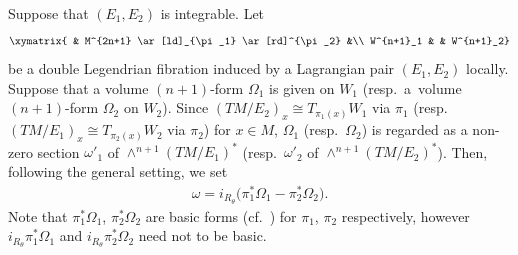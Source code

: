 \documentclass[pdftex]{sigma}
\begin{document}
Suppose that $(E_1, E_2)$ is integrable.
Let
\begin{gather*}
\xymatrix{
& M^{2n+1} \ar[ld]_{\pi_1} \ar[rd]^{\pi_2}  &\\
W^{n+1}_1 &  & W^{n+1}_2}
\end{gather*}
be a double Legendrian f\/ibration induced by a
Lagrangian pair $(E_1, E_2)$ locally.
Suppose that
a volume $(n+1)$-form ${\Omega_1}$ is given on $W_1$
(resp.\ a~volume $(n+1)$-form ${\Omega_2}$ on $W_2$).
Since
$(TM/E_2)_x \cong T_{\pi_1(x)}W_1$ via $\pi_1$
(resp.\ $(TM/E_1)_x \cong T_{\pi_2(x)}W_2$ via $\pi_2$) for $x\in M$,
${\Omega_1}$ (resp.~${\Omega_2}$)
is regarded as a non-zero section $\omega'_1$ of
$\wedge^{n+1}(TM/E_1)^*$ (resp.~$\omega'_2$ of
$\wedge^{n+1}(TM/E_2)^*$).
Then, following the general setting,  we set
\begin{gather*}
\omega = i_{R_\theta} \big(\pi_1^*\Omega_1 - \pi_2^*\Omega_2\big).
\end{gather*}
Note that $\pi_1^*\Omega_1$, $\pi_2^*\Omega_2$
are basic forms (cf.~\cite{I-L}) for $\pi_1$, $\pi_2$ respectively, however
$i_{R_\theta} \pi_1^*\Omega_1$ and $i_{R_\theta} \pi_2^*\Omega_2$
need not to be basic.
\end{document}
